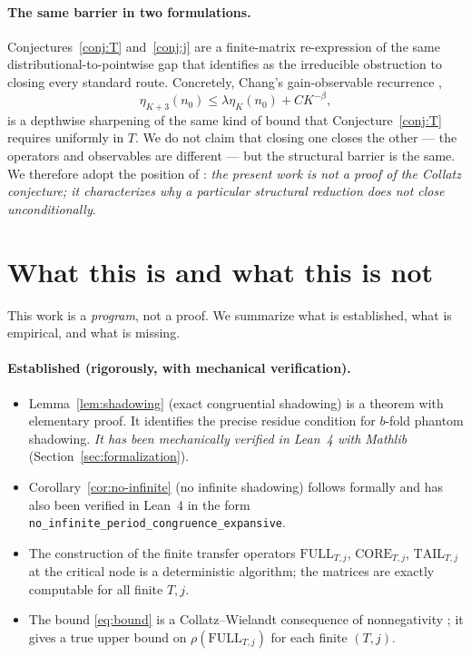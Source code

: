 \documentclass[11pt,a4paper]{article}
\theoremstyle{definition}
\newcommand{\full}{\mathrm{FULL}}
\newcommand{\core}{\mathrm{CORE}}
\newcommand{\tail}{\mathrm{TAIL}}
\newcommand{\spec}{\rho}
\begin{document}
\paragraph{The same barrier in two formulations.}
Conjectures~\ref{conj:T} and~\ref{conj:j} are a finite-matrix
re-expression of the same distributional-to-pointwise gap that
\cite[Sect.~9]{chang2026} identifies as the irreducible obstruction
to closing every standard route. Concretely, Chang's gain-observable
recurrence \cite[Conj.~9.18]{chang2026},
\[
\eta_{K+3}(n_0) \le \lambda \eta_K(n_0) + C K^{-\beta},
\]
is a depthwise sharpening of the same kind of bound that
Conjecture~\ref{conj:T} requires uniformly in $T$. We do not claim
that closing one closes the other --- the operators and observables
are different --- but the structural barrier is the same. We
therefore adopt the position of \cite{chang2026}: \emph{the present
work is not a proof of the Collatz conjecture; it characterizes
why a particular structural reduction does not close
unconditionally}.

\section{What this is and what this is not}
\label{sec:limits}

This work is a \emph{program}, not a proof. We summarize what is
established, what is empirical, and what is missing.

\paragraph{Established (rigorously, with mechanical verification).}
\begin{itemize}
  \item Lemma~\ref{lem:shadowing} (exact congruential shadowing)
        is a theorem with elementary proof. It identifies the
        precise residue condition for $b$-fold phantom shadowing.
        \emph{It has been mechanically verified in Lean~4 with
        Mathlib} (Section~\ref{sec:formalization}).
  \item Corollary~\ref{cor:no-infinite} (no infinite shadowing)
        follows formally and has also been verified in Lean~4 in
        the form \texttt{no\_infinite\_period\_congruence\_expansive}.
  \item The construction of the finite transfer operators
        $\full_{T,j}$, $\core_{T,j}$, $\tail_{T,j}$ at the critical
        node is a deterministic algorithm; the matrices are
        exactly computable for all finite $T, j$.
  \item The bound \eqref{eq:bound} is a Collatz--Wielandt
        consequence of nonnegativity \cite{lemmensnussbaum}; it
        gives a true upper bound on $\spec(\full_{T,j})$ for each
        finite $(T, j)$.
\end{itemize}
\end{document}
